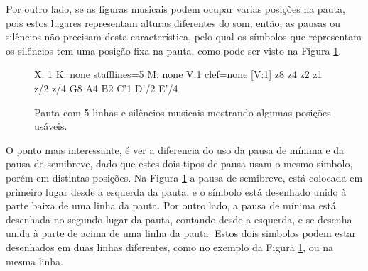 Por outro lado, se as figuras musicais podem ocupar varias posições na pauta,
pois estos lugares representam alturas diferentes do som; então, 
as pausas  ou silêncios não precisam desta característica,
pelo qual os símbolos que representam os silêncios tem uma posição fixa na pauta,
como pode ser visto na Figura \ref{fig:abc-pautasilencio}.
\begin{figure}[h]
\centering
\begin{abc}[name=abc-pautasilencio]
%
X: 1 %
K: none stafflines=5 %
M: none %
V:1 clef=none %
%
[V:1] z8 z4 z2 z1 z/2 z/4 G8 A4 B2 C'1 D'/2 E'/4 
\end{abc}
\caption{Pauta com 5 linhas e silêncios musicais mostrando algumas posições usáveis.}
\label{fig:abc-pautasilencio}
\end{figure}

O ponto mais interessante, é ver a diferencia do uso  da pausa de mínima e da pausa de semibreve,
dado que estes dois tipos de pausa usam o mesmo símbolo, porém em distintas posições.
Na Figura \ref{fig:abc-pautasilencio} a pausa de semibreve, 
está colocada em primeiro lugar desde a esquerda da pauta,
e o símbolo está desenhado unido à parte baixa de uma linha da pauta.
Por outro lado, a pausa de mínima está desenhada no segundo lugar da pauta,
contando desde a esquerda, e se desenha unida à parte de acima de uma linha da pauta.
Estos dois simbolos podem estar desenhados em duas linhas diferentes, 
como no exemplo da Figura \ref{fig:abc-pautasilencio}, ou na mesma linha.


